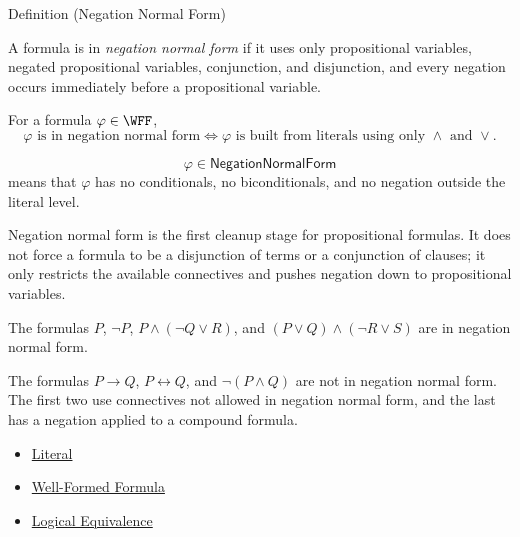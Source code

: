 \begin{definitionbox}{Definition (Negation Normal Form)}
\begin{definition}
\label{def:negation-normal-form-propositional-logic}
A formula is in \emph{negation normal form} if it uses only propositional
variables, negated propositional variables, conjunction, and disjunction, and
every negation occurs immediately before a propositional variable.
\end{definition}
\end{definitionbox}

\begin{remark*}
For a formula \(\varphi\in\WFF\),
\[
\varphi\text{ is in negation normal form}
\Longleftrightarrow
\varphi\text{ is built from literals using only }\land\text{ and }\lor.
\]
\end{remark*}

\begin{remark*}
\[
\varphi\in\mathsf{NegationNormalForm}
\]
means that \(\varphi\) has no conditionals, no biconditionals, and no negation
outside the literal level.
\end{remark*}

\begin{remark*}[Interpretation]
Negation normal form is the first cleanup stage for propositional formulas.
It does not force a formula to be a disjunction of terms or a conjunction of
clauses; it only restricts the available connectives and pushes negation down
to propositional variables.
\end{remark*}

\begin{remark*}[Examples]
The formulas \(P\), \(\neg P\), \(P\land(\neg Q\lor R)\), and
\((P\lor Q)\land(\neg R\lor S)\) are in negation normal form.
\end{remark*}

\begin{remark*}
The formulas \(P\to Q\), \(P\leftrightarrow Q\), and \(\neg(P\land Q)\) are not
in negation normal form. The first two use connectives not allowed in negation
normal form, and the last has a negation applied to a compound formula.
\end{remark*}

\begin{dependencies}
\begin{itemize}
  \item \hyperref[def:literal-propositional-logic]{Literal}
  \item \hyperref[def:well-formed-formula]{Well-Formed Formula}
  \item \hyperref[def:logical-equivalence-propositional-logic]{Logical Equivalence}
\end{itemize}
\end{dependencies}

